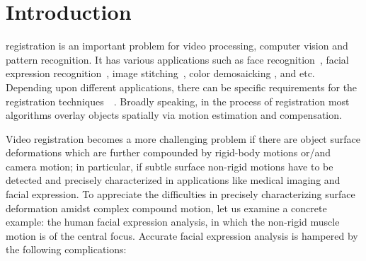 \documentclass[10pt,journal]{IEEEtran}
\begin{document}
\maketitle


\IEEEdisplaynotcompsoctitleabstractindextext


%
\IEEEpeerreviewmaketitle


\section{Introduction}

 registration is an important problem for video processing, computer vision and pattern recognition. It has various applications such as face recognition~\cite{Wagner2009}, facial expression recognition~\cite{Valstar12}, image stitching~\cite{Szeliski06}, color demosaicking \cite{Wu_TIP06}, and etc. Depending upon different applications, there can be specific requirements for the registration techniques~\cite{Uenohara95}~\cite{Caspi_PAMI02}. Broadly speaking, in the process of registration most algorithms overlay objects spatially via motion estimation and compensation. 

Video registration becomes a more challenging problem if there are object surface deformations which are further compounded by rigid-body motions or/and camera motion; in particular, if subtle surface non-rigid motions have to be detected and precisely characterized in applications like medical imaging and facial expression. To appreciate the difficulties in precisely characterizing surface deformation amidst complex compound motion, let us examine a concrete example: the human facial expression analysis, in which the non-rigid muscle motion is of the central focus.  Accurate facial expression analysis is hampered by the following complications:
\end{document}
